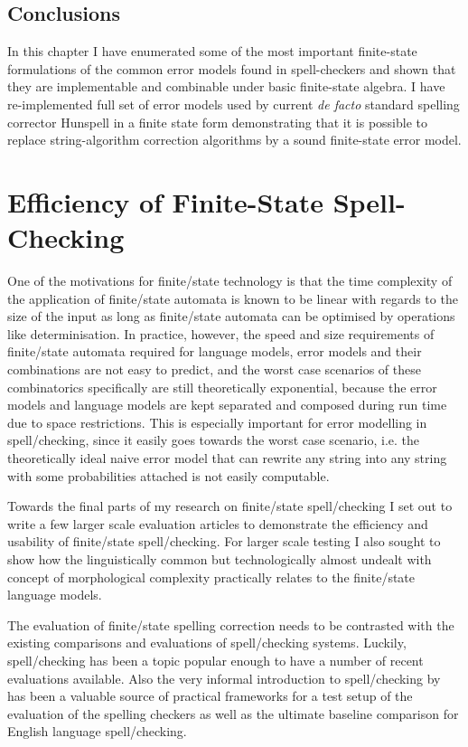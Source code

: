 \documentclass[officiallayout,final]{unihelcompling}
\begin{document}
\section{Conclusions}

In this chapter I have enumerated some of the most important finite-state
formulations of the common error models found in spell-checkers and shown that
they are implementable and combinable under basic finite-state algebra. I have
re-implemented full set of error models used by current \emph{de facto}
standard spelling corrector Hunspell in a finite state form demonstrating that
it is possible to replace string-algorithm correction algorithms by a sound
finite-state error model.

\chapter{Efficiency of Finite-State Spell-Checking}
\label{chap:efficiency}

One of the motivations for finite\-/state technology is that the time
complexity of the application of finite\-/state automata is known to be linear
with regards to the size of the input as long as finite\-/state automata can be
optimised by operations like determinisation. In practice, however, the speed
and size requirements of finite\-/state automata required for language models,
error models and their combinations are not easy to predict, and the worst case
scenarios of these combinatorics specifically are still theoretically
exponential, because the error models and language models are kept separated
and composed during run time due to space restrictions. This is especially
important for error modelling in spell\-/checking, since it easily goes towards
the worst case scenario, i.e. the theoretically ideal naive error model that
can rewrite any string into any string with some probabilities attached is not
easily computable.

Towards the final parts of my research on finite\-/state spell\-/checking I set
out to write a few larger scale evaluation articles to demonstrate the
efficiency and usability of finite\-/state spell\-/checking. For larger scale
testing I also sought to show how the linguistically common but technologically
almost undealt with concept of \gls{morphological complexity} practically
relates to the finite\-/state language models.

The evaluation of finite\-/state spelling correction needs to be contrasted
with the existing comparisons and evaluations of spell\-/checking systems.
Luckily, spell\-/checking has been a topic popular enough to have a number
of recent evaluations available.  Also the very informal introduction to
spell\-/checking by~\citet{norvig2010howto} has been a valuable source of
practical frameworks for a test setup of the evaluation of the spelling
checkers as well as the ultimate baseline comparison for English language
spell\-/checking.
\end{document}
